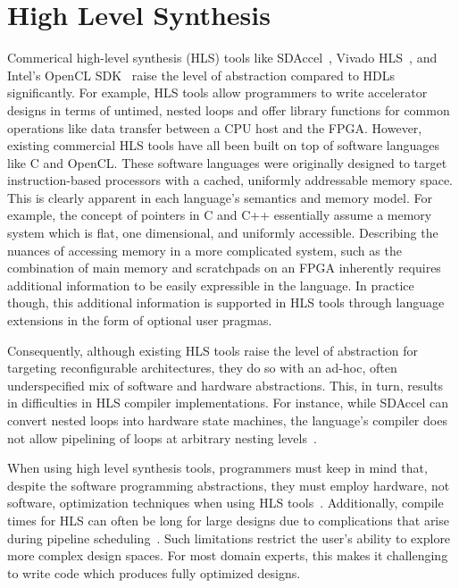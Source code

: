 \section{High Level Synthesis}
Commerical high-level synthesis (HLS) tools like SDAccel~\cite{sdaccel}, Vivado HLS~\cite{vivadohls},
and Intel's OpenCL SDK~\cite{opencl_sdk} raise the level of abstraction compared to HDLs significantly.
For example, HLS tools allow programmers to write accelerator designs in terms of untimed, nested loops
and offer library functions for common operations like data transfer between a CPU host and the FPGA.
However, existing commercial HLS tools have all been built on top of software languages like C and OpenCL.
These software languages were originally designed to target instruction-based processors with a cached, uniformly addressable memory space.
This is clearly apparent in each language's semantics and memory model.
For example, the concept of pointers in C and C++ essentially assume a memory system which is flat, one dimensional, and uniformly accessible.
Describing the nuances of accessing memory in a more complicated system, such as the combination of main memory and
scratchpads on an FPGA inherently requires additional information to be easily expressible in the language.
In practice though, this additional information is supported in HLS tools through language
extensions in the form of optional user pragmas.

Consequently, although existing HLS tools raise the level of abstraction for targeting reconfigurable architectures,
they do so with an ad-hoc, often underspecified mix of software and hardware abstractions.
This, in turn, results in difficulties in HLS compiler implementations.
For instance, while SDAccel can convert nested loops into hardware state machines,
the language's compiler does not allow pipelining of loops at arbitrary nesting levels~\cite{vivado_userguide}.

When using high level synthesis tools, programmers must keep in mind that,
despite the software programming abstractions, they must employ hardware,
not software, optimization techniques when using HLS tools~\cite{nane2016survey}.
Additionally, compile times for HLS can often be long for large designs due to
complications that arise during pipeline scheduling~\cite{Aladdin}.
Such limitations restrict the user's ability to explore more complex design spaces.
For most domain experts, this makes it challenging to write code which produces fully optimized designs.

